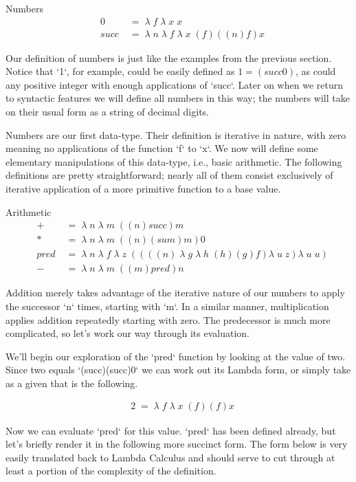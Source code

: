 Numbers
\begin{align*}
& 0 \; &= \; \lambda \; f \; \lambda \; x \; x
\\& succ \; &= \; \lambda \; n \; \lambda \; f \; \lambda \; x \; (f)((n)f)x
\end{align*}

Our definition of numbers is just like the examples from the previous section.
Notice that `1`, for example, could be easily defined as $1 = (succ 0)$, as could
any positive integer with enough applications of `succ`. Later on when we return
to syntactic features we will define all numbers in this way; the numbers will
take on their usual form as a string of decimal digits.

Numbers are our first data-type. Their definition is iterative in nature, with
zero meaning no applications of the function `f` to `x`. We now will define some
elementary manipulations of this data-type, i.e., basic arithmetic. The following
definitions are pretty straightforward; nearly all of them consist exclusively of
iterative application of a more primitive function to a base value.

Arithmetic
\begin{align*}
& + \; &= \; \lambda \; n \; \lambda \; m \; ((n)succ)m
\\& * \; &= \; \lambda \; n \; \lambda \; m \; ((n)(sum)m)0
\\& pred \; &= \; \lambda \; n \; \lambda \; f \; \lambda \; z \; ((((n) \; \lambda \; g \; \lambda \; h \; (h)(g)f)\lambda \; u \; z)\lambda \; u \; u)
\\& - \; &= \; \lambda \; n \; \lambda \; m \; ((m)pred)n
\end{align*}

Addition merely takes advantage of the iterative nature of our numbers to apply
the successor `n` times, starting with `m`. In a similar manner, multiplication
applies addition repeatedly starting with zero. The predecessor is much more
complicated, so let's work our way through its evaluation.

We'll begin our exploration of the `pred` function by looking at the value of two. 
Since two equals `(succ)(succ)0` we can work out its Lambda form, or simply take
as a given that is the following.

\begin{align*}
& 2 \; = \; \lambda \; f \; \lambda \; x \; (f)(f)x
\end{align*}

Now we can evaluate `pred` for this value. `pred` has been defined already, but
let's briefly render it in the following more succinct form. The form below is
very easily translated back to Lambda Calculus and should serve to cut through at
least a portion of the complexity of the definition.

